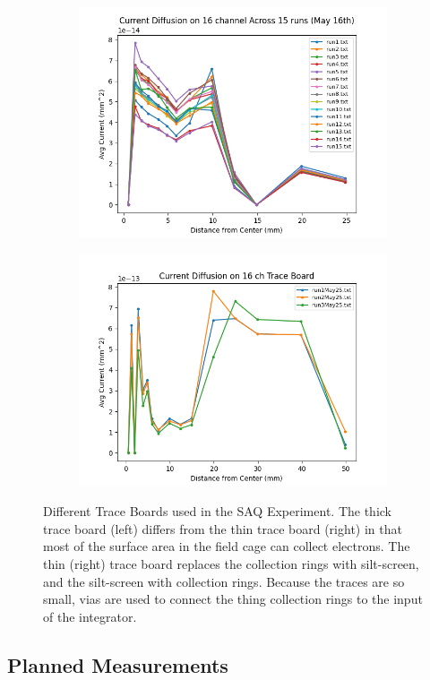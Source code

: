 \begin{figure}[]
\centering
\begin{subfigure}{.45\textwidth}
  \centering
  \includegraphics[width=\textwidth]{images/fullBoard_ConvertedAvgCurrentDiffusion.png}
  \caption{}
\end{subfigure}%
\begin{subfigure}{.45\textwidth}
  \centering
  \includegraphics[width=\textwidth]{images/traceBoard_ConvertedAvgCurrentDiffusion.png}
  \caption{}
\end{subfigure}
\caption{Different Trace Boards used in the SAQ Experiment.
The thick trace board (left) differs from the thin trace board (right) in that most of the surface area in the field cage can collect electrons.
The thin (right) trace board replaces the collection rings with silt-screen, and the silt-screen with collection rings.
Because the traces are so small, vias are used to connect the thing collection rings to the input of the integrator.
}
\label{fig:trace_boards_current_data}
\end{figure}

\subsection{Planned Measurements}

